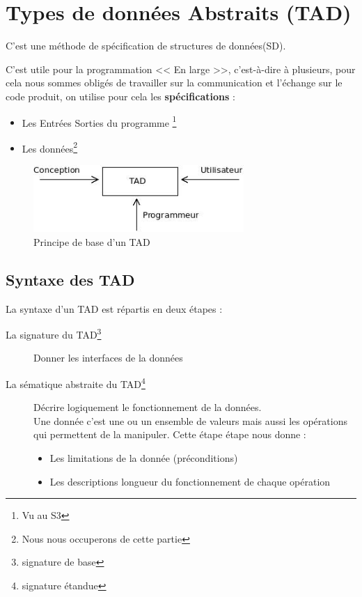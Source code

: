 \chapter{Types de données Abstraits (TAD)}
C'est une méthode de spécification de structures de données(SD).

C'est utile pour la programmation << En large >>, c'est-à-dire à plusieurs, pour cela nous sommes obligés de travailler sur la communication et
l'échange sur le code produit, on utilise pour cela les \textbf{spécifications} : 
\begin{itemize}
	\item Les Entrées Sorties du programme \footnote{Vu au S3}
	\item Les données\footnote{Nous nous occuperons de cette partie}
\end{itemize}
\begin{figure}[H]
	\centering
	\includegraphics[width=8cm]{1.jpg}
	\caption{Principe de base d'un TAD}
\end{figure}

\section{Syntaxe des TAD}
La syntaxe d'un TAD est répartis en deux étapes : 
\begin{description}
	\item[La signature du TAD\footnote{signature de base}] Donner les interfaces de la données
	\item[La sématique abstraite du TAD\footnote{signature étandue}] Décrire logiquement le fonctionnement de la données.\\
		Une donnée c'est une ou un ensemble de valeurs mais aussi les opérations qui permettent de la manipuler. Cette étape étape nous donne : 
		\begin{itemize}
			\item Les limitations de la donnée (préconditions)
			\item Les descriptions longueur du fonctionnement de chaque opération
		\end{itemize}
\end{description}
